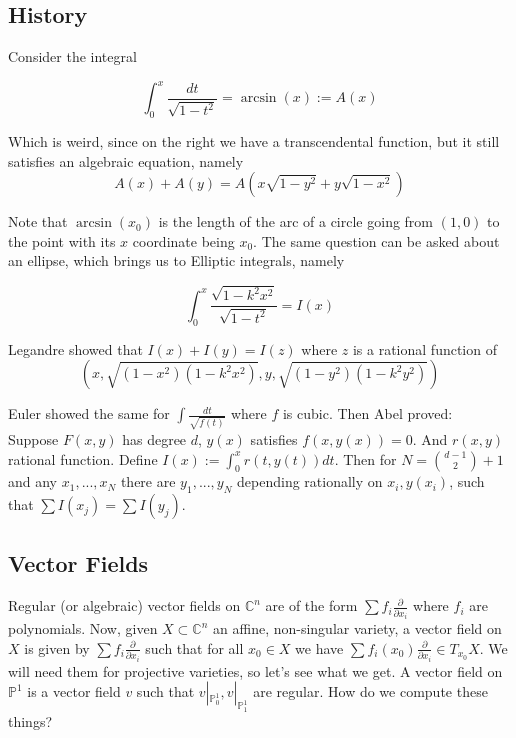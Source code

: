 \documentclass[12pt]{article}
\theoremstyle{remark}
\newcommand{\C}{\mathbb{C}}
\newcommand{\Pp}{\mathbb{P}}
\begin{document}
\subsection{History}

Consider the integral 

$$\int_0^x \dfrac{dt}{\sqrt{1-t^2}} = \arcsin(x) := A(x) $$

Which is weird, since on the right we have a transcendental function, but it still satisfies an algebraic equation, namely
$$A(x)+A(y) = A(x \sqrt{1-y^2} + y \sqrt{1-x^2} )$$

Note that $\arcsin(x_0)$ is the length of the arc of a circle going from $(1,0)$ to the point with its $x$ coordinate being $x_0$. The same question can be asked about an ellipse, which brings us to Elliptic integrals, namely

$$\int_0^x \dfrac{\sqrt{1-k^2x^2}}{\sqrt{1-t^2}} = I(x)$$

Legandre showed that $I(x)+I(y) = I(z)$ where $z$ is a rational function of $$(x, \sqrt{(1-x^2)(1-k^2x^2)}, y , \sqrt{(1-y^2)(1-k^2y^2)} )$$

Euler showed the same for $\int \frac{dt}{\sqrt{f(t)}}$ where $f$ is cubic. Then Abel proved:\\

Suppose $F(x,y)$ has degree $d$, $y(x)$ satisfies $f(x,y(x)) = 0$. And $r(x,y)$ rational function. Define $I(x) := \int_0^x r(t,y(t)) dt$. Then for $N = \binom{d-1}{2}+1$ and any $x_1,...,x_N$ there are $y_1,...,y_N$ depending rationally on $x_i, y(x_i)$, such that $\sum I(x_j) = \sum I(y_j)$.

\subsection{Vector Fields}

Regular (or algebraic) vector fields on $\C^n$ are of the form $\sum f_i \frac{\partial}{\partial x_i}$ where $f_i$ are polynomials. Now, given $X \subset \C^n$ an affine, non-singular variety, a vector field on $X$ is given by $\sum f_i \frac{\partial}{\partial x_i}$ such that for all $x_0 \in X$ we have $\sum f_i(x_0) \frac{\partial}{\partial x_i} \in T_{x_0}X$. We will need them for projective varieties, so let's see what we get. A vector field on $\Pp^1$ is a vector field $v$ such that $v|_{\Pp_0^1}, v|_{\Pp_1^1}$ are regular. How do we compute these things? \\
\end{document}
